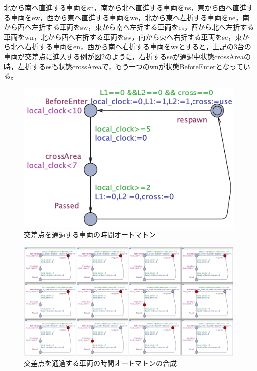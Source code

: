 \documentclass{tpu-sotu}
\begin{document}
	北から南へ直進する車両をsn，南から北へ直進する車両をns，東から西へ直進する車両をew，西から東へ直進する車両をwe，北から東へ左折する車両をne，南から西へ左折する車両をsw，東から南へ左折する車両をes，西から北へ左折する車両をwn，北から西へ右折する車両をsw，南から東へ右折する車両をse，東から北へ右折する車両をen，西から南へ右折する車両をwsとすると，上記の3台の車両が交差点に進入する例が図\ref{SimpleS}のように，右折するseが通過中状態crossAreaの時，左折するesも状態crossAreaで，もう一つのwnが状態BeforeEnterとなっている。
	\begin{figure}[htbp]
	\centering
	\includegraphics[width=140mm]{SimpleIntersection.png}
	\caption{交差点を通過する車両の時間オートマトン}
	\label{Simple}
	\end{figure}
	\begin{figure}[htbp]
	\centering
	\includegraphics[width=150mm]{SimpleIntersectionSimu.png}
	\caption{交差点を通過する車両の時間オートマトンの合成}
	\label{SimpleS}
	\end{figure}
	\newpage
\end{document}
